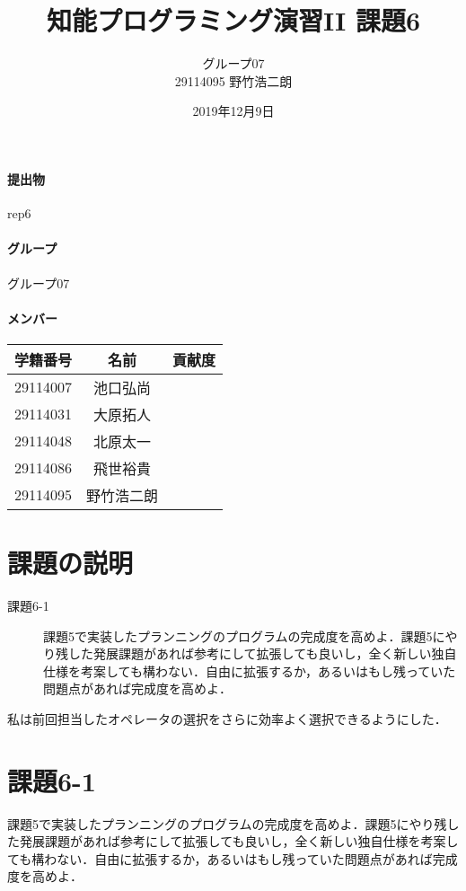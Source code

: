 \documentclass[a4j]{jarticle}
\title{知能プログラミング演習II 課題6}
\author{グループ07\\
  29114095 野竹浩二朗\\
}
\date{2019年12月9日}
\begin{document}
\maketitle

\paragraph{提出物} rep6
\paragraph{グループ} グループ07
\paragraph{メンバー}
\begin{tabular}{|c|c|c|}
  \hline\hline
  学籍番号&名前&貢献度\\
  \hline\hline
  29114007&池口弘尚&\\
  \hline
  29114031&大原拓人&\\
  \hline
  29114048&北原太一&\\
  \hline
  29114086&飛世裕貴&\\
  \hline
  29114095&野竹浩二朗&\\
  \hline
\end{tabular}



\section{課題の説明}
\begin{description}
\item[課題6-1] 課題5で実装したプランニングのプログラムの完成度を高めよ．課題5にやり残した発展課題があれば参考にして拡張しても良いし，全く新しい独自仕様を考案しても構わない．自由に拡張するか，あるいはもし残っていた問題点があれば完成度を高めよ．

\end{description}
私は前回担当したオペレータの選択をさらに効率よく選択できるようにした．
\section{課題6-1}
\begin{screen}
課題5で実装したプランニングのプログラムの完成度を高めよ．課題5にやり残した発展課題があれば参考にして拡張しても良いし，全く新しい独自仕様を考案しても構わない．自由に拡張するか，あるいはもし残っていた問題点があれば完成度を高めよ．
\end{screen}
\end{document}
